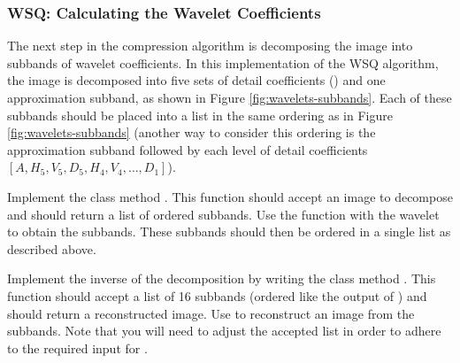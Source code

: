 \begin{comment}
To get the mean, min, and max of an array, and the max of two elements,
we use the following commands:
\begin{lstlisting}
>>> # assume we have an array M, numerical values a and b
>>> M.mean()
>>> M.max()
>>> M.min()
>>> max(a,b)
\end{lstlisting}
\end{comment}


\subsubsection*{WSQ: Calculating the Wavelet Coefficients}
The next step in the compression algorithm is decomposing the image into subbands of wavelet coefficients.
In this implementation of the WSQ algorithm, the image is decomposed into five sets of detail coefficients () and one approximation subband, as shown in Figure \ref{fig:wavelets-subbands}.
Each of these subbands should be placed into a list in the same ordering as in Figure \ref{fig:wavelets-subbands} (another way to consider this ordering is the approximation subband followed by
each level of detail coefficients $[A, H_5, V_5, D_5, H_4, V_4,\dots ,D_1]$).

\begin{problem}
Implement the class method .
This function should accept an image to decompose and should return a list of ordered subbands.
Use the function  with the  wavelet to obtain the subbands.
These subbands should then be ordered in a single list as described above.

Implement the inverse of the decomposition by writing the class method .
This function should accept a list of 16 subbands (ordered like the output of ) and should return a reconstructed image.
Use  to reconstruct an image from the subbands.
Note that you will need to adjust the accepted list in order to adhere to the required input for .
\end{problem}

